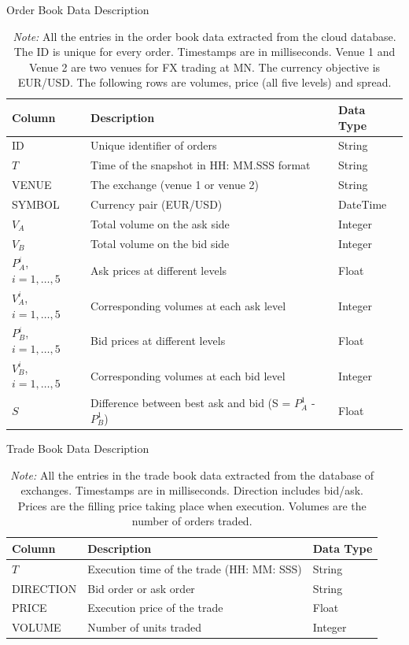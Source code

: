\begin{table}[tbp]
    \centering
    \caption{Order Book Data Description}
    \caption*{\textit{Note:} All the entries in the order book data extracted from the cloud database. The ID is unique for every order. Timestamps are in milliseconds. Venue 1 and Venue 2 are two venues for FX trading at MN. The currency objective is EUR/USD. The following rows are volumes, price (all five levels) and spread.}
    \begin{tabular}{lll}
        \toprule
        \textbf{Column} & \textbf{Description} & \textbf{Data Type} \\
        \midrule
        ID & Unique identifier of orders & String \\
        $T$ & Time of the snapshot in HH: MM.SSS format & String \\
        VENUE & The exchange (venue 1 or venue 2) & String \\
        SYMBOL & Currency pair (EUR/USD) & DateTime \\
        $V_A$ & Total volume on the ask side & Integer \\
        $V_B$ & Total volume on the bid side & Integer \\
        $P_A ^ {i}$, $i = 1, \dots, 5$ & Ask prices at different levels & Float \\
        $V_A ^ {i}$, $i = 1, \dots, 5$ & Corresponding volumes at each ask level & Integer \\
        $P_B ^ {i}$, $i = 1, \dots, 5$ & Bid prices at different levels & Float \\
        $V_B ^ {i}$, $i = 1, \dots, 5$ & Corresponding volumes at each bid level & Integer \\
        $S$ & Difference between best ask and bid (S = $P_A ^ {1}$ - $P_B ^ {1}$) & Float \\
        \bottomrule
    \end{tabular} 
    \label{tb: order book data description}
\end{table}

\begin{table}[tbp] 
    \centering 
    \caption{Trade Book Data Description}
    \caption*{\textit{Note:} All the entries in the trade book data extracted from the database of exchanges. Timestamps are in milliseconds. Direction includes bid/ask. Prices are the filling price taking place when execution. Volumes are the number of orders traded.}
    \begin{tabular}{lll} 
        \toprule 
        \textbf{Column} & \textbf{Description} & \textbf{Data Type} \\ 
        \midrule 
        $T$ & Execution time of the trade (HH: MM: SSS) & String \\
        DIRECTION & Bid order or ask order & String \\
        PRICE & Execution price of the trade & Float \\ 
        VOLUME & Number of units traded & Integer \\  
        \bottomrule 
    \end{tabular} 
    \label{tb: trade book data description}  
\end{table}

